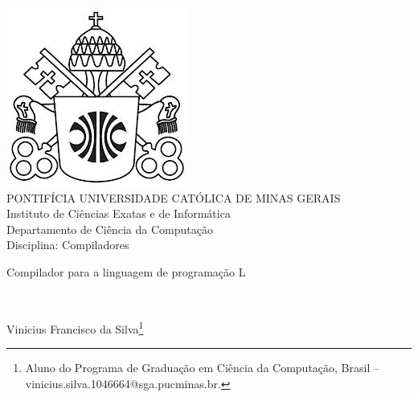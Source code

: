 \documentclass[a4paper,12pt,Times]{article}
\makeatletter
\newcommand{\monog}{ 
\begin{center}
Compilador para a linguagem de programação L    
\end{center}}
\newcommand{\origem}{Brasil }
\newcommand{\AutorA}{Vinicius Francisco da Silva}
\newcommand{\funcaoA}{}
\newcommand{\emailA}{vinicius.silva.1046664@sga.pucminas.br}
\newcommand{\cursA}{Aluno do Programa de Graduação em Ciência da Computação}
\newcommand{\keyword}[1]{\textsf{#1}}
\makeatother
\begin{document}

\begin{center}
\includegraphics[scale=0.2]{figuras/brasao.jpg} \\
PONTIFÍCIA UNIVERSIDADE CATÓLICA DE MINAS GERAIS \\
Instituto de Ciências Exatas e de Informática \\
Departamento de Ciência da Computação \\
Disciplina: Compiladores


\end{center}

 \vspace{0cm} {
 	\singlespacing \Large{\monog {} \\ }
 }

\vspace{1.0cm}

\begin{flushright}
\singlespacing 
\normalsize{\AutorA \footnote{\funcaoA \cursA, \origem -- \emailA . }}
\end{flushright}
\thispagestyle{empty}

\vspace{1.0cm}




 \onehalfspace  %
 \setlength{\parindent}{1.25cm}







\end{document}
